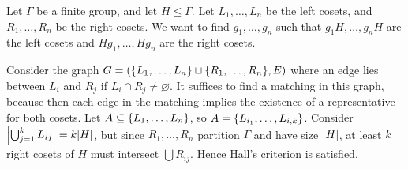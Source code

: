 \begin{example}
	Let \( \Gamma \) be a finite group, and let \( H \leq \Gamma \).
	Let \( L_1, \dots, L_n \) be the left cosets, and \( R_1, \dots, R_n \) be the right cosets.
	We want to find \( g_1, \dots, g_n \) such that \( g_1 H, \dots, g_n H \) are the left cosets and \( H g_1, \dots, H g_n \) are the right cosets.

	Consider the graph \( G = (\qty{L_1, \dots, L_n} \sqcup \qty{R_1, \dots, R_n}, E) \) where an edge lies between \( L_i \) and \( R_j \) if \( L_i \cap R_j \neq \varnothing \).
	It suffices to find a matching in this graph, because then each edge in the matching implies the existence of a representative for both cosets.
	Let \( A \subseteq \qty{L_1, \dots, L_n} \), so \( A = \qty{L_{i_1}, \dots, L_{i,k}} \).
	Consider \( \abs{\bigcup_{j=1}^k L_{ij}} = k \abs{H} \), but since \( R_1, \dots, R_n \) partition \( \Gamma \) and have size \( \abs{H} \), at least \( k \) right cosets of \( H \) must intersect \( \bigcup R_{ij} \).
	Hence Hall's criterion is satisfied.
\end{example}

